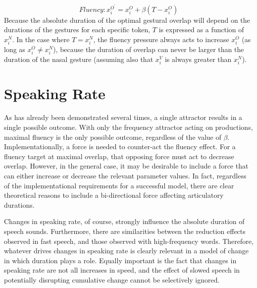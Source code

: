 \begin{equation}
\textit{Fluency}:x_{i}^{O^{\prime}}=x_{i}^{O}+\beta(T-x_{i}^{O})\label{eq:Frequency attractor}
\end{equation}
Because the absolute duration of the optimal gestural overlap will
depend on the durations of the gestures for each specific token, $T$
is expressed as a function of $x_{i}^{N}$. In the case where $T=x_{i}^{N}$,
the fluency pressure always acts to increase $x_{i}^{O}$ (as long
as $x_{i}^{O}\neq x_{i}^{N}$), because the duration of overlap can
never be larger than the duration of the nasal gesture (assuming also
that $x_{i}^{V}$ is always greater than $x_{i}^{N}$). 

\section{Speaking Rate}

As has already been demonstrated several times, a single attractor
results in a single possible outcome. With only the frequency attractor
acting on productions, maximal fluency is the only possible outcome,
regardless of the value of $\beta$. Implementationally, a force is
needed to counter-act the fluency effect. For a fluency target at
maximal overlap, that opposing force must act to decrease overlap.
However, in the general case, it may be desirable to include a force
that can either increase or decrease the relevant parameter values.
In fact, regardless of the implementational requirements for a successful
model, there are clear theoretical reasons to include a bi-directional
force affecting articulatory durations. 

Changes in speaking rate, of course, strongly influence the absolute
duration of speech sounds. Furthermore, there are similarities between
the reduction effects observed in fast speech, and those observed
with high-frequency words. Therefore, whatever drives changes in speaking
rate is clearly relevant in a model of change in which duration plays
a role. Equally important is the fact that changes in speaking rate
are not all increases in speed, and the effect of slowed speech in
potentially disrupting cumulative change cannot be selectively ignored. 

